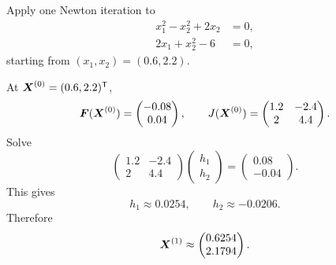 \begin{example}
Apply one Newton iteration to
\[
\begin{aligned}
 x_1^2-x_2^2+2x_2&=0,\\
 2x_1+x_2^2-6&=0,
\end{aligned}
\]
starting from $(x_1,x_2)=(0.6,2.2)$.
\end{example}

\begin{solution}[5.5cm]
At $\boldsymbol{X}^{(0)}=(0.6,2.2)^{\mathsf T}$,
\[
 \boldsymbol{F}(\boldsymbol{X}^{(0)})
 =\begin{pmatrix}-0.08\\0.04\end{pmatrix},
 \qquad
 J(\boldsymbol{X}^{(0)})
 =\begin{pmatrix}1.2&-2.4\\2&4.4\end{pmatrix}.
\]
Solve
\[
 \begin{pmatrix}1.2&-2.4\\2&4.4\end{pmatrix}
 \begin{pmatrix}h_1\\h_2\end{pmatrix}
 =\begin{pmatrix}0.08\\-0.04\end{pmatrix}.
\]
This gives
\[
 h_1\approx0.0254,
 \qquad
 h_2\approx-0.0206.
\]
Therefore
\[
 \boldsymbol{X}^{(1)}
 \approx\begin{pmatrix}0.6254\\2.1794\end{pmatrix}.
\]
\end{solution}
